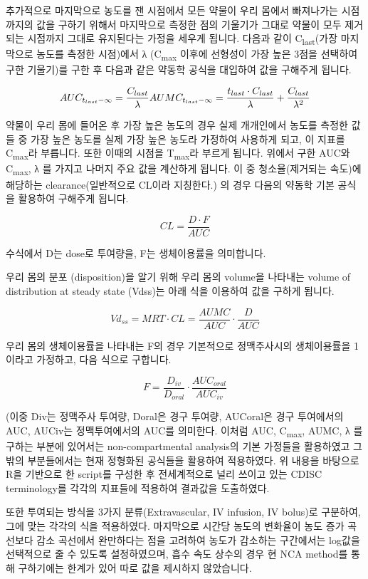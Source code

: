 \documentclass[12pt,]{krantz}
\theoremstyle{definition}
\theoremstyle{definition}
\theoremstyle{definition}
\theoremstyle{remark}
\begin{document}
추가적으로 마지막으로 농도를 잰 시점에서 모든 약물이 우리 몸에서
빠져나가는 시점까지의 값을 구하기 위해서 마지막으로 측정한 점의 기울기가
그대로 약물이 모두 제거되는 시점까지 그대로 유지된다는 가정을 세우게
됩니다. 다음과 같이 C\textsubscript{last}(가장 마지막으로 농도를 측정한
시점)에서 λ (C\textsubscript{max} 이후에 선형성이 가장 높은 3점을
선택하여 구한 기울기)를 구한 후 다음과 같은 약동학 공식을 대입하여 값을
구해주게 됩니다.

\[
AUC_{t_{last}-\infty} = 
  \frac{C_{last}}{\lambda} \\
AUMC_{t_{last}-\infty} = 
  \frac{t_{last} \cdot C_{last}}{\lambda} + 
  \frac{C_{last}}{\lambda^2}
\]

약물이 우리 몸에 들어온 후 가장 높은 농도의 경우 실제 개개인에서 농도를
측정한 값들 중 가장 높은 농도를 실제 가장 높은 농도라 가정하여 사용하게
되고, 이 지표를 C\textsubscript{max}라 부릅니다. 또한 이때의 시점을
T\textsubscript{max}라 부르게 됩니다. 위에서 구한 AUC와
C\textsubscript{max}, λ 를 가지고 나머지 주요 값을 계산하게 됩니다. 이
중 청소율(제거되는 속도)에 해당하는 clearance(일반적으로 CL이라
지칭한다.) 의 경우 다음의 약동학 기본 공식을 활용하여 구해주게 됩니다.

\[
CL = \frac{D \cdot F}{AUC}
\]

수식에서 D는 dose로 투여량을, F는 생체이용률을 의미합니다.

우리 몸의 분포 (disposition)을 알기 위해 우리 몸의 volume을 나타내는
volume of distribution at steady state (Vdss)는 아래 식을 이용하여 값을
구하게 됩니다.

\[
Vd_{ss} = MRT \cdot CL = \frac{AUMC}{AUC} \cdot \frac{D}{AUC}
\]

우리 몸의 생체이용률을 나타내는 F의 경우 기본적으로 정맥주사시의
생체이용률을 1이라고 가정하고, 다음 식으로 구합니다.

\[
F = \frac{D_{iv}}{D_{oral}} \cdot \frac{AUC_{oral}}{AUC_{iv}}
\]

(이중 Div는 정맥주사 투여량, Doral은 경구 투여량, AUCoral은 경구
투여에서의 AUC, AUCiv는 정맥투여에서의 AUC를 의미한다. 이처럼 AUC,
C\textsubscript{max}, AUMC, λ 를 구하는 부분에 있어서는
non-compartmental analysis의 기본 가정들을 활용하였고 그 밖의
부분들에서는 현재 정형화된 공식들을 활용하여 적용하였다. 위 내용을
바탕으로 R을 기반으로 한 script를 구성한 후 전세계적으로 널리 쓰이고
있는 CDISC terminology를 각각의 지표들에 적용하여 결과값을 도출하였다.

또한 투여되는 방식을 3가지 분류(Extravascular, IV infusion, IV bolus)로
구분하여, 그에 맞는 각각의 식을 적용하였다. 마지막으로 시간당 농도의
변화율이 농도 증가 곡선보다 감소 곡선에서 완만하다는 점을 고려하여
농도가 감소하는 구간에서는 log값을 선택적으로 줄 수 있도록 설정하였으며,
흡수 속도 상수의 경우 현 NCA method를 통해 구하기에는 한계가 있어 따로
값을 제시하지 않았습니다.
\end{document}
